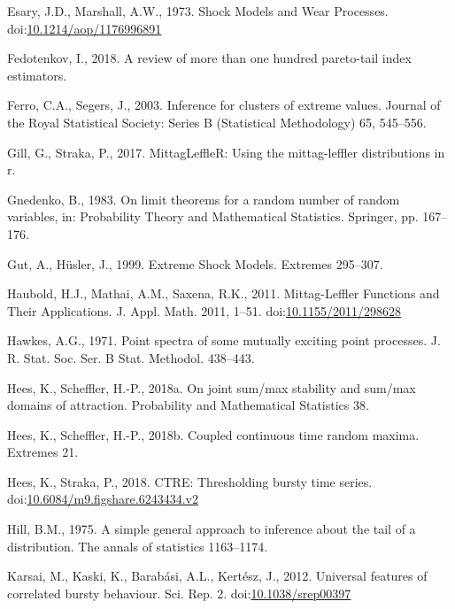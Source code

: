 \documentclass[]{elsarticle} %
\begin{document}
\leavevmode\hypertarget{ref-Esary1973}{}%
Esary, J.D., Marshall, A.W., 1973. Shock Models and Wear Processes.
doi:\href{https://doi.org/10.1214/aop/1176996891}{10.1214/aop/1176996891}

\leavevmode\hypertarget{ref-fedotenkov2018review}{}%
Fedotenkov, I., 2018. A review of more than one hundred pareto-tail
index estimators.

\leavevmode\hypertarget{ref-ferro2003inference}{}%
Ferro, C.A., Segers, J., 2003. Inference for clusters of extreme values.
Journal of the Royal Statistical Society: Series B (Statistical
Methodology) 65, 545--556.

\leavevmode\hypertarget{ref-MittagLeffleR}{}%
Gill, G., Straka, P., 2017. MittagLeffleR: Using the mittag-leffler
distributions in r.

\leavevmode\hypertarget{ref-gnedenko1983limit}{}%
Gnedenko, B., 1983. On limit theorems for a random number of random
variables, in: Probability Theory and Mathematical Statistics. Springer,
pp. 167--176.

\leavevmode\hypertarget{ref-Gut1999}{}%
Gut, A., Hüsler, J., 1999. Extreme Shock Models. Extremes 295--307.

\leavevmode\hypertarget{ref-Haubold11}{}%
Haubold, H.J., Mathai, A.M., Saxena, R.K., 2011. Mittag-Leffler
Functions and Their Applications. J. Appl. Math. 2011, 1--51.
doi:\href{https://doi.org/10.1155/2011/298628}{10.1155/2011/298628}

\leavevmode\hypertarget{ref-hawkes1971point}{}%
Hawkes, A.G., 1971. Point spectra of some mutually exciting point
processes. J. R. Stat. Soc. Ser. B Stat. Methodol. 438--443.

\leavevmode\hypertarget{ref-hees2016joint}{}%
Hees, K., Scheffler, H.-P., 2018a. On joint sum/max stability and
sum/max domains of attraction. Probability and Mathematical Statistics
38.

\leavevmode\hypertarget{ref-hees2017coupled}{}%
Hees, K., Scheffler, H.-P., 2018b. Coupled continuous time random
maxima. Extremes 21.

\leavevmode\hypertarget{ref-CTRE}{}%
Hees, K., Straka, P., 2018. CTRE: Thresholding bursty time series.
doi:\href{https://doi.org/10.6084/m9.figshare.6243434.v2}{10.6084/m9.figshare.6243434.v2}

\leavevmode\hypertarget{ref-hill1975simple}{}%
Hill, B.M., 1975. A simple general approach to inference about the tail
of a distribution. The annals of statistics 1163--1174.

\leavevmode\hypertarget{ref-Karsai2012}{}%
Karsai, M., Kaski, K., Barabási, A.L., Kertész, J., 2012. Universal
features of correlated bursty behaviour. Sci. Rep. 2.
doi:\href{https://doi.org/10.1038/srep00397}{10.1038/srep00397}
\end{document}
